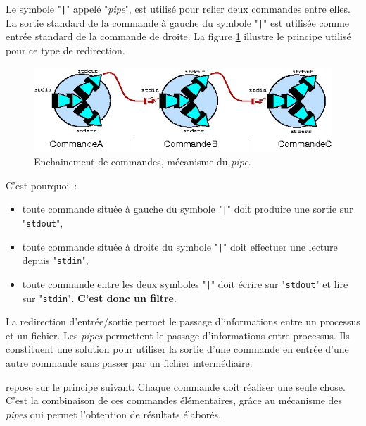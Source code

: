 Le symbole "\texttt{|}" appel{\'e} "\textsl{pipe}", est
utilis{\'e} pour relier deux commandes entre elles. La
sortie standard de la
commande {\`a} gauche du symbole "\texttt{|}" est utilis{\'e}e comme
entr{\'e}e standard de
la commande de droite. La figure \ref{fig-basnot-out2in} illustre le
principe utilis{\'e} pour ce type de redirection.

\begin{figure}[hbtp]
	\centering
	\includegraphics{./_Images/basic-notions/out2in.jpg}
	\caption{\label{fig-basnot-out2in}Enchainement de commandes, m{\'e}canisme du \textsl{pipe}.}
\end{figure}

C'est pourquoi~:
\begin{itemize}
	\item	toute commande situ{\'e}e {\`a} gauche du symbole "\texttt{|}" doit produire une
			sortie sur "\texttt{stdout}",
	\item	toute commande situ{\'e}e {\`a} droite du symbole "\texttt{|}" doit effectuer une
			lecture depuis "\texttt{stdin}",
	\item	toute commande entre les deux symboles "\texttt{|}" doit {\'e}crire sur
			"\texttt{stdout}" et lire sur "\texttt{stdin}". {\bf C'est donc un filtre}.
\end{itemize}

La redirection d'entr{\'e}e/sortie permet le passage d'informations entre un
processus et un fichier. Les \textsl{pipes} permettent le passage d'informations
entre processus. Ils constituent une solution pour utiliser la
sortie d'une commande en entr{\'e}e d'une autre commande sans passer par un
fichier interm{\'e}diaire.

{\Unix} repose sur le principe suivant. Chaque commande doit r{\'e}aliser
une seule chose. C'est la combinaison de ces commandes {\'e}l{\'e}mentaires,
gr{\^a}ce au m{\'e}canisme des \textsl{pipes} qui permet l'obtention de r{\'e}sultats
{\'e}labor{\'e}s.

